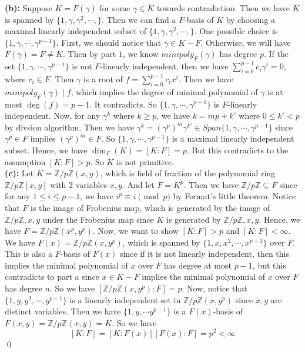 \documentclass[12pt]{amsart}
\newcommand{\Z}{\mathbb{Z}}
\begin{document}
\textbf{(b):} Suppose $K=F(\gamma)$ for some $\gamma\in K$ towards contradiction. Then we have $K$ is spanned by $\{1,\gamma,\gamma^2,\cdots,\}$. Then we can find a $F$-basis of $K$ by choosing a maximal linearly independent subset of $\{1,\gamma,\gamma^2,\cdots,\}$. One possible choice is $\{1,\gamma,\cdots, \gamma^{p-1}\}$. First, we should notice that $\gamma\in K-F$. Otherwise, we will have $F(\gamma)=F\neq K$. Then by part $1$, we know $minipoly_F(\gamma)$ has degree $p$. If the set $\{1,\gamma,\cdots, \gamma^{p-1}\}$ is not $F$-linearly independent, then we have $\sum_{i=0}^{p-1}c_i\gamma^i=0$, where $c_i\in F$. Then $\gamma$ is a root of $f=\sum_{i=0}^{p-1}c_ix^i$. Then we have $minipoly_F(\gamma)\mid f$, which implies the degree of minimal polynomial of $\gamma$ is at most $\deg(f)=p-1$. It contradicts. So $\{1,\gamma,\cdots, \gamma^{p-1}\}$ is $F$-linearly independent. Now, for any $\gamma^k$ where $k\geq p$, we have $k=mp+k'$ where $0\leq k'<p$ by divsion algorithm. Then we have $\gamma^k=(\gamma^p)^m \gamma^{k'}\in Span\{1,\gamma,\cdots, \gamma^{p-1}\}$ since $\gamma^p\in F$ implies $(\gamma^p)^m\in F$. So $\{1,\gamma,\cdots, \gamma^{p-1}\}$ is a maximal linearly independent subset. Hence, we have $\dim_F(K)=[K:F]=p$. But this contradicts to the assumption $[K:F]>p$. So $K$ is not primitive.
\\\textbf{(c):} Let $K=\Z/p\Z(x,y)$, which is field of fraction of the polynomial ring $\Z/p\Z[x,y]$ with 2 variables $x,y$. And let $F=K^p$. Then we have $\Z/p\Z\subseteq F$ since for any $1\leq i\leq p-1$, we have $i^p\equiv i\pmod{p}$ by Fermat's little theorem. Notice that $F$ is the image of Frobenius map, which is generated by the image of $\Z/p\Z,x,y$ under the Frobenius map since $K$ is generated by $\Z/p\Z,x,y$. Hence, we have $F=\Z/p\Z(x^p,y^p)$. Now, we want to show $[K:F]>p$ and $[K:F]<\infty$.\\
We have $F(x)=\Z/p\Z(x,y^p)$, which is spanned by $\{1,x,x^2,\cdots, x^{p-1}\}$ over $F$. This is also a $F$-basis of $F(x)$ since if it is not linearly independent, then this implies the minimal polynomial of $x$ over $F$ has degree at most $p-1$, but this contradicts to part a since $x\in K-F$ implies the minimal polynomial of $x$ over $F$ has degree $n$. So we have $[\Z/p\Z(x,y^p):F]=p$.  Now, notice that $\{1,y,y^2,\cdots, y^{p-1}\}$ is a linearly independent set in $\Z/p\Z(x,y^p)$ since $x,y$ are distinct variables. Then we have $\{1,y,\cdots y^{p-1}\}$ is a $F(x)$-basis of $F(x,y)=\Z/p\Z(x,y)=K$. So we have 
\[[K:F]=[K:F(x)][F(x):F]=p^2<\infty\]
\qed\\
\end{document}
